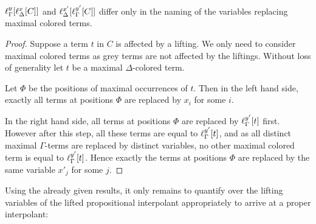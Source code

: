 \begin{lemma}

	$ \ell_{\Gamma}^{y}[ \ell_{\Delta}^{x}[ C]  ]$ and 
	$ \ell_{\Delta}^{x'}[ \ell_{\Gamma}^{y'}[ C]  ]$
	differ only in the naming of the variables replacing maximal colored terms.
	\label{lemma:naming_of_colored_variables}

\end{lemma}
\begin{proof}
	Suppose a term $t$ in $C$ is affected by a lifting.
	We only need to consider maximal colored terms as grey terms are not affected by the liftings.
	Without loss of generality let $t$ be a maximal $\Delta$-colored term.

	Let $\Phi$ be the positions of maximal occurrences of $t$.
	Then in the left hand side, exactly all terms at positions $\Phi$ are replaced by $x_i$ for some $i$.

	In the right hand side, all terms at positions $\Phi$ are replaced by $\ell_{\Gamma}^{y'}[t]$ first. 
	However after this step,
	all these terms are equal to $\ell_{\Gamma}^{y'}[t]$, and as all distinct maximal $\Gamma$-terms are replaced by distinct variables, no other maximal colored term is equal to $\ell_{\Gamma}^{y'}[t]$.
	Hence exactly the terms at positions $\Phi$ are replaced by the same variable $x'_j$ for some $j$.
\end{proof}


Using the already given results, it only remains to quantify over the lifting variables of the lifted propositional interpolant appropriately to arrive at a proper interpolant:

